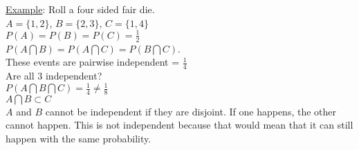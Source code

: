     \underline{Example}:
      Roll a four sided fair die.\\
      $A = \{ 1, 2\}$, $B = \{2, 3\}$, $C = \{1, 4\}$\\
      $P(A) = P(B) = P(C) = \frac{1}{2}$\\
      $P(A \bigcap B) = P(A \bigcap C) = P(B \bigcap C)$.\\
      These events are pairwise independent = $\frac{1}{4}$\\
      Are all 3 independent?\\
      $P(A \bigcap B \bigcap C) = \frac{1}{4} \not= \frac{1}{8}$\\
      $A \bigcap B \subset C$\\
      $A$ and $B$ cannot be independent if they are disjoint. If one happens,
      the other cannot happen. This is not independent because that would
      mean that it can still happen with the same probability.
